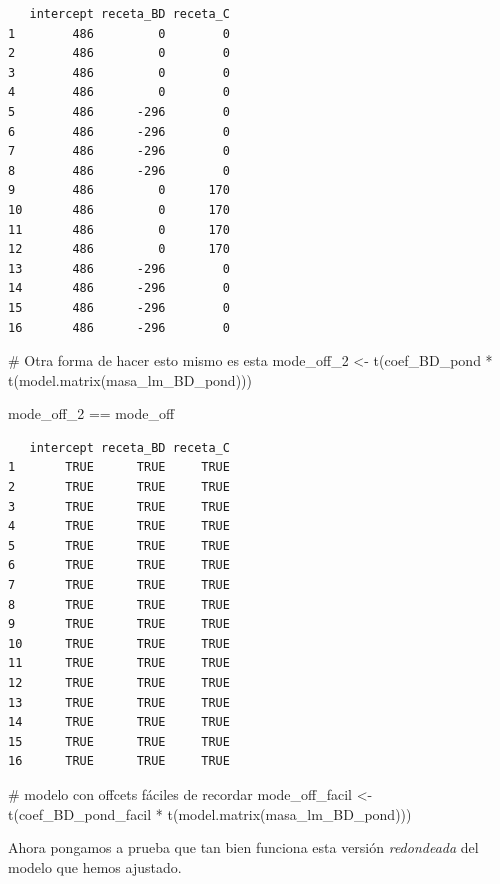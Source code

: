 \documentclass[
  letterpaper,
  DIV=11,
  numbers=noendperiod]{scrartcl}
\newenvironment{Shaded}{\begin{snugshade}}{\end{snugshade}}
\newcommand{\CommentTok}[1]{\textcolor[rgb]{0.37,0.37,0.37}{#1}}
\newcommand{\FunctionTok}[1]{\textcolor[rgb]{0.28,0.35,0.67}{#1}}
\newcommand{\NormalTok}[1]{\textcolor[rgb]{0.00,0.23,0.31}{#1}}
\newcommand{\OtherTok}[1]{\textcolor[rgb]{0.00,0.23,0.31}{#1}}
\newcommand{\SpecialCharTok}[1]{\textcolor[rgb]{0.37,0.37,0.37}{#1}}
\begin{document}
\begin{verbatim}
   intercept receta_BD receta_C
1        486         0        0
2        486         0        0
3        486         0        0
4        486         0        0
5        486      -296        0
6        486      -296        0
7        486      -296        0
8        486      -296        0
9        486         0      170
10       486         0      170
11       486         0      170
12       486         0      170
13       486      -296        0
14       486      -296        0
15       486      -296        0
16       486      -296        0
\end{verbatim}

\begin{Shaded}
\begin{Highlighting}[]
\CommentTok{\# Otra forma de hacer esto mismo es esta}
\NormalTok{mode\_off\_2 }\OtherTok{\textless{}{-}} \FunctionTok{t}\NormalTok{(coef\_BD\_pond }\SpecialCharTok{*} \FunctionTok{t}\NormalTok{(}\FunctionTok{model.matrix}\NormalTok{(masa\_lm\_BD\_pond)))}

\NormalTok{mode\_off\_2 }\SpecialCharTok{==}\NormalTok{ mode\_off}
\end{Highlighting}
\end{Shaded}

\begin{verbatim}
   intercept receta_BD receta_C
1       TRUE      TRUE     TRUE
2       TRUE      TRUE     TRUE
3       TRUE      TRUE     TRUE
4       TRUE      TRUE     TRUE
5       TRUE      TRUE     TRUE
6       TRUE      TRUE     TRUE
7       TRUE      TRUE     TRUE
8       TRUE      TRUE     TRUE
9       TRUE      TRUE     TRUE
10      TRUE      TRUE     TRUE
11      TRUE      TRUE     TRUE
12      TRUE      TRUE     TRUE
13      TRUE      TRUE     TRUE
14      TRUE      TRUE     TRUE
15      TRUE      TRUE     TRUE
16      TRUE      TRUE     TRUE
\end{verbatim}

\begin{Shaded}
\begin{Highlighting}[]
\CommentTok{\# modelo con offcets fáciles de recordar}
\NormalTok{mode\_off\_facil }\OtherTok{\textless{}{-}} \FunctionTok{t}\NormalTok{(coef\_BD\_pond\_facil }\SpecialCharTok{*} \FunctionTok{t}\NormalTok{(}\FunctionTok{model.matrix}\NormalTok{(masa\_lm\_BD\_pond)))}
\end{Highlighting}
\end{Shaded}

Ahora pongamos a prueba que tan bien funciona esta versión
\emph{redondeada} del modelo que hemos ajustado.
\end{document}
